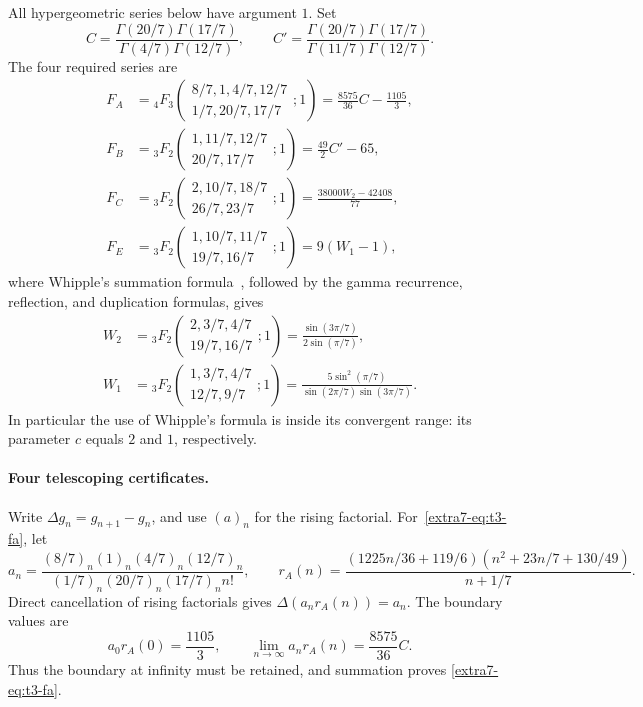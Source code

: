 \documentclass[11pt,a4paper]{article}
\theoremstyle{definition}
\theoremstyle{remark}
\numberwithin{equation}{section}
\begin{document}
All hypergeometric series below have argument $1$.  Set
\[
 C=\frac{\Gamma(20/7)\Gamma(17/7)}{\Gamma(4/7)\Gamma(12/7)},
 \qquad
 C'=\frac{\Gamma(20/7)\Gamma(17/7)}{\Gamma(11/7)\Gamma(12/7)}.
\]
The four required series are
\begin{align}
 F_A&={}_4F_3\left(\begin{matrix}8/7,1,4/7,12/7\\1/7,20/7,17/7\end{matrix};1\right)
       =\frac{8575}{36}C-\frac{1105}{3}, \label{extra7-eq:t3-fa}\\
 F_B&={}_3F_2\left(\begin{matrix}1,11/7,12/7\\20/7,17/7\end{matrix};1\right)
       =\frac{49}{2}C'-65, \label{extra7-eq:t3-fb}\\
 F_C&={}_3F_2\left(\begin{matrix}2,10/7,18/7\\26/7,23/7\end{matrix};1\right)
       =\frac{38000W_2-42408}{77}, \label{extra7-eq:t3-fc}\\
 F_E&={}_3F_2\left(\begin{matrix}1,10/7,11/7\\19/7,16/7\end{matrix};1\right)
       =9(W_1-1), \label{extra7-eq:t3-fe}
\end{align}
where Whipple's summation formula~\cite[Eq.~16.4.7]{extra7-dlmf}, followed by
the gamma recurrence, reflection, and duplication formulas, gives
\begin{align}
 W_2&={}_3F_2\left(\begin{matrix}2,3/7,4/7\\19/7,16/7\end{matrix};1\right)
      =\frac{\sin(3\pi/7)}{2\sin(\pi/7)}, \label{extra7-eq:t3-w2}\\
 W_1&={}_3F_2\left(\begin{matrix}1,3/7,4/7\\12/7,9/7\end{matrix};1\right)
      =\frac{5\sin^2(\pi/7)}{\sin(2\pi/7)\sin(3\pi/7)}.
      \label{extra7-eq:t3-w1}
\end{align}
In particular the use of Whipple's formula is inside its convergent
range: its parameter $c$ equals $2$ and $1$, respectively.

\paragraph{Four telescoping certificates.}
Write $\Delta g_n=g_{n+1}-g_n$, and use $(a)_n$ for the rising factorial.
For~\eqref{extra7-eq:t3-fa}, let
\[
 a_n=\frac{(8/7)_n(1)_n(4/7)_n(12/7)_n}
 {(1/7)_n(20/7)_n(17/7)_n n!},\qquad
 r_A(n)=\frac{(1225n/36+119/6)(n^2+23n/7+130/49)}{n+1/7}.
\]
Direct cancellation of rising factorials gives
$\Delta(a_n r_A(n))=a_n$.  The boundary values are
\[
 a_0r_A(0)=\frac{1105}{3},\qquad
 \lim_{n\to\infty}a_nr_A(n)=\frac{8575}{36}C.
\]
Thus the boundary at infinity must be retained, and summation proves
\eqref{extra7-eq:t3-fa}.
\end{document}
